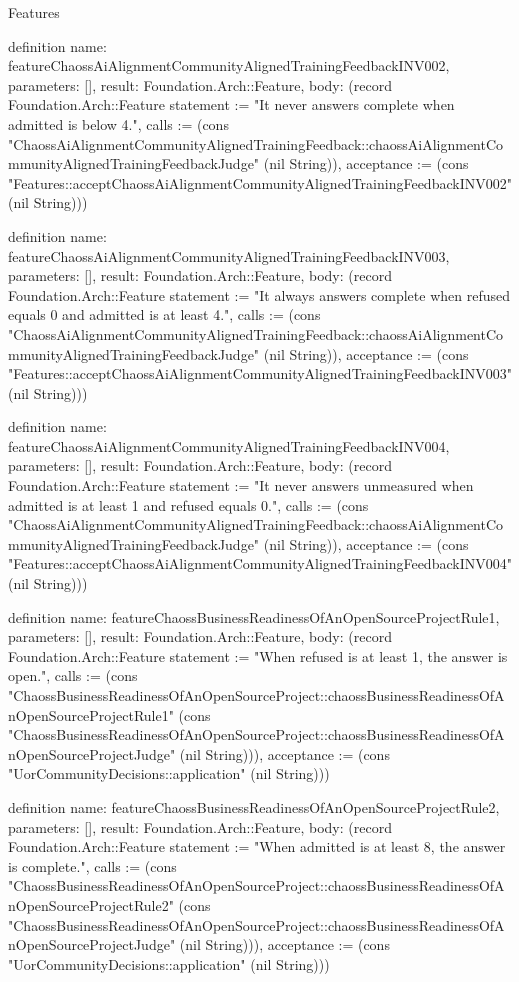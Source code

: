 \begin{lexlean}{Features}
\begin{semanticmodule}
definition{
  name: featureChaossAiAlignmentCommunityAlignedTrainingFeedbackINV002,
  parameters: [],
  result: Foundation.Arch::Feature,
  body: (record Foundation.Arch::Feature {statement := "It never answers complete when admitted is below 4.", calls := (cons "ChaossAiAlignmentCommunityAlignedTrainingFeedback::chaossAiAlignmentCommunityAlignedTrainingFeedbackJudge" (nil String)), acceptance := (cons "Features::acceptChaossAiAlignmentCommunityAlignedTrainingFeedbackINV002" (nil String))})
}

definition{
  name: featureChaossAiAlignmentCommunityAlignedTrainingFeedbackINV003,
  parameters: [],
  result: Foundation.Arch::Feature,
  body: (record Foundation.Arch::Feature {statement := "It always answers complete when refused equals 0 and admitted is at least 4.", calls := (cons "ChaossAiAlignmentCommunityAlignedTrainingFeedback::chaossAiAlignmentCommunityAlignedTrainingFeedbackJudge" (nil String)), acceptance := (cons "Features::acceptChaossAiAlignmentCommunityAlignedTrainingFeedbackINV003" (nil String))})
}

definition{
  name: featureChaossAiAlignmentCommunityAlignedTrainingFeedbackINV004,
  parameters: [],
  result: Foundation.Arch::Feature,
  body: (record Foundation.Arch::Feature {statement := "It never answers unmeasured when admitted is at least 1 and refused equals 0.", calls := (cons "ChaossAiAlignmentCommunityAlignedTrainingFeedback::chaossAiAlignmentCommunityAlignedTrainingFeedbackJudge" (nil String)), acceptance := (cons "Features::acceptChaossAiAlignmentCommunityAlignedTrainingFeedbackINV004" (nil String))})
}

definition{
  name: featureChaossBusinessReadinessOfAnOpenSourceProjectRule1,
  parameters: [],
  result: Foundation.Arch::Feature,
  body: (record Foundation.Arch::Feature {statement := "When refused is at least 1, the answer is open.", calls := (cons "ChaossBusinessReadinessOfAnOpenSourceProject::chaossBusinessReadinessOfAnOpenSourceProjectRule1" (cons "ChaossBusinessReadinessOfAnOpenSourceProject::chaossBusinessReadinessOfAnOpenSourceProjectJudge" (nil String))), acceptance := (cons "UorCommunityDecisions::application" (nil String))})
}

definition{
  name: featureChaossBusinessReadinessOfAnOpenSourceProjectRule2,
  parameters: [],
  result: Foundation.Arch::Feature,
  body: (record Foundation.Arch::Feature {statement := "When admitted is at least 8, the answer is complete.", calls := (cons "ChaossBusinessReadinessOfAnOpenSourceProject::chaossBusinessReadinessOfAnOpenSourceProjectRule2" (cons "ChaossBusinessReadinessOfAnOpenSourceProject::chaossBusinessReadinessOfAnOpenSourceProjectJudge" (nil String))), acceptance := (cons "UorCommunityDecisions::application" (nil String))})
}


\end{semanticmodule}
\end{lexlean}
